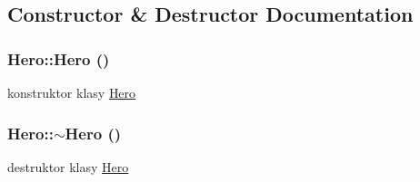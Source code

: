 \subsection{Constructor \& Destructor Documentation}
\hypertarget{class_hero_ab5920677a4b5cb59d6f513922d037dca}{
\subsubsection[{Hero}]{\setlength{\rightskip}{0pt plus 5cm}Hero::Hero ()}}
\label{class_hero_ab5920677a4b5cb59d6f513922d037dca}
konstruktor klasy \hyperlink{class_hero}{Hero} \hypertarget{class_hero_a5aeef41ede5a80dc29c5acd7b553c4da}{
\subsubsection[{$\sim$Hero}]{\setlength{\rightskip}{0pt plus 5cm}Hero::$\sim$Hero ()}}
\label{class_hero_a5aeef41ede5a80dc29c5acd7b553c4da}
destruktor klasy \hyperlink{class_hero}{Hero} 

